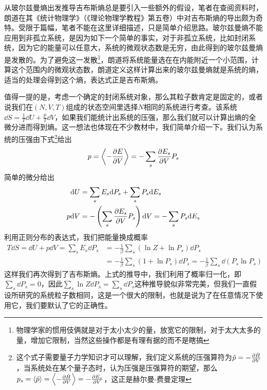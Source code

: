 \documentclass[../../main.tex]{subfiles}
\begin{document}
从玻尔兹曼熵出发推导吉布斯熵总是要引入一些额外的假设，笔者在查阅资料时，朗道在其《统计物理学》（《理论物理学教程》第五卷）中对吉布斯熵的导出颇为奇特。受限于篇幅，笔者不能在这里详细描述，只是简单介绍思路。玻尔兹曼熵不能应用到非孤立系统，是因为如下一个简单的事实，对于非孤立系统，比如封闭系统，因为它的能量可以任意大，系统的微观状态数是无穷，由此得到的玻尔兹曼熵是发散的。为了避免这一发散\footnote{物理学家的惯用伎俩就是对于太小太少的量，放宽它的限制，对于太大太多的量，增加它限制，当然这些操作都是有理有据的而不是瞎搞}，朗道将系统能量选在在内能附近一个小范围，计算这个范围内的微观状态数，朗道定义这样计算出来的玻尔兹曼熵就是系统的熵，适当的处理会得到这个熵，表达式正是吉布斯熵。

值得一提的是，考虑一个确定的封闭系统对象，那么其粒子数肯定是固定的，或者说我们在\((N,V,T)\)组成的状态空间里选择\(N\)相同的系统进行考查。该系统\(\dd S=\frac{1}{T}\dd U+\frac{p}{T}\dd V\)，如果我们能统计出系统的压强，那么我们就可以计算出熵的全微分进而得到熵。这一想法也体现在不少教材中，我们简单介绍一下。我们认为系统的压强由下式\footnote{这个式子需要量子力学知识才可以理解，我们定义系统的压强算符为\(\hat{p}=-\pdv{\hat{H}}{V}\)，当系统处在某个量子态时，认为压强是压强算符的期望，那么\(p_s=\expval{\hat{p}}=\expval{-\pdv{\hat{H}}{V}}=-\pdv{E_s}{V}\)，这正是赫尔曼-费曼定理}给出
\begin{equation}
    p=\expval{-\pdv{E}{V}}=-\sum_s \pdv{E_s}{V}P_s
\end{equation}
简单的微分给出
\begin{equation}
    \begin{split}
        \dd U&=\sum_sE_s\dd P_s+\sum_s P_s\dd E_s \\
        p\dd V&=-\left(\sum_s\pdv{E_s}{V}P_s\right)\dd V=-\sum_s P_s\dd E_s
    \end{split}
\end{equation}
利用正则分布的表达式，我们把能量换成概率
\begin{equation}
    \begin{split}
        T\dd S=\dd U+p\dd V=\sum_s E_s\dd P_s&=-\frac{1}{\beta}\sum_s (\ln Z+\ln P_s)\dd P_s \\
        &=-\frac{1}{\beta}\sum_s (1+\ln P_s)\dd P_s=-\frac{1}{\beta}\sum_s \dd(P_s\ln P_s)
    \end{split}
\end{equation}
这样我们再次得到了吉布斯熵。上式的推导中，我们利用了概率归一化，即\(\sum_s\dd P_s=0\)，因此\(\sum_s\ln Z\dd P_s=\sum_s\dd P_s\)这种推导貌似非常完美，但我们一直假设所研究的系统粒子数相同，这是一个很大的限制，也就是说为了在任意情况下使用它，我们要默认了它的正确性。
\end{document}
